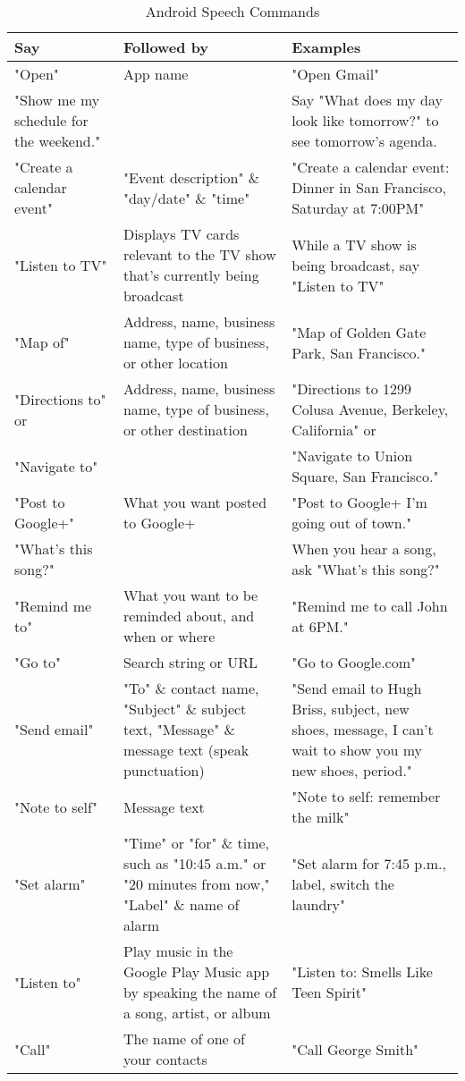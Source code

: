 \begin{table}[htbp]
  \centering
  \caption{Android Speech Commands}\label{tab:asc}
 \renewcommand{\arraystretch}{1.2}
    \begin{tabularx}{\textwidth}{p{3cm}XX}
    \toprule
    \textbf{Say} & \textbf{Followed by} & \textbf{Examples} \\
    \midrule
    "Open" & App name & "Open Gmail" \\ \hline
   "Show me my schedule for the weekend." &       & Say "What does my day look like tomorrow?" to see tomorrow's agenda. \\ \hline
    "Create a calendar event" & "Event description" \& "day/date" \& "time" & "Create a calendar event: Dinner in San Francisco, Saturday at 7:00PM" \\ \hline
    "Listen to TV" & Displays TV cards relevant to the TV show that's currently being broadcast & While a TV show is being broadcast, say "Listen to TV" \\ \hline
    "Map of" & Address, name, business name, type of business, or other location & "Map of Golden Gate Park, San Francisco." \\ \hline
    "Directions to" or & Address, name, business name, type of business, or other destination & "Directions to 1299 Colusa Avenue, Berkeley, California" or \\ \hline
    "Navigate to" &       & "Navigate to Union Square, San Francisco." \\ \hline
    "Post to Google+" & What you want posted to Google+ & "Post to Google+ I'm going out of town." \\ \hline
    "What's this song?" &       & When you hear a song, ask "What's this song?" \\ \hline
    "Remind me to" & What you want to be reminded about, and when or where & "Remind me to call John at 6PM." \\ \hline
    "Go to" & Search string or URL & "Go to Google.com" \\ \hline
    "Send email" & "To" \& contact name, "Subject" \& subject text, "Message" \& message text (speak punctuation)  & "Send email to Hugh Briss, subject, new shoes, message, I can’t wait to show you my new shoes, period." \\ \hline
    "Note to self" & Message text & "Note to self: remember the milk" \\ \hline
    "Set alarm" & "Time" or "for" \& time, such as "10:45 a.m." or "20 minutes from now," "Label" \& name of alarm & "Set alarm for 7:45 p.m., label, switch the laundry" \\ \hline
    "Listen to" & Play music in the Google Play Music app by speaking the name of a song, artist, or album & "Listen to: Smells Like Teen Spirit" \\ \hline
    "Call" & The name of one of your contacts & "Call George Smith" \\
    \bottomrule
    \end{tabularx}%
  \label{tab:addlabel}%
\end{table}%
